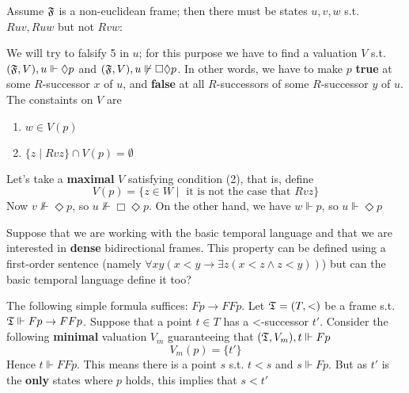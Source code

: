 \documentclass[11pt]{article}
\begin{document}
\begin{examplle}[]
Assume \(\mathfrak{F}\) is a non-euclidean frame; then there must be states \(u,v,w\)
s.t. \(Ruv,Ruw\) but not \(Rvw\):
We will try to falsify 5 in \(u\); for this purpose we have to find a
valuation \(V\) s.t. \((\mathfrak{F},V),u\Vdash\Diamond p\) and
\((\mathfrak{F},V),u\not\Vdash\Box\Diamond p\). In other words, we have to make \(p\)
\textbf{true} at some \(R\)-successor \(x\) of \(u\), and \textbf{false} at all
\(R\)-successors of some \(R\)-successor \(y\) of \(u\). The constaints on
\(V\) are
\begin{enumerate}
\item \(w\in V(p)\)
\item \(\{z\mid Rvz\}\cap V(p)=\emptyset\)
\end{enumerate}


Let's take a \textbf{maximal} \(V\) satisfying condition (2), that is, define
\begin{equation*}
V(p)=\{z\in W\mid\text{ it is not the case that }Rvz\}
\end{equation*}
Now \(v\not\Vdash\Diamond p\), so \(u\not\Vdash\Box\Diamond p\). On the other
hand, we have \(w\Vdash p\), so \(u\Vdash\Diamond p\)
\end{examplle}

\begin{examplle}[]
Suppose that we are working with the basic temporal language and that we are
interested in \textbf{dense} bidirectional frames. This property can be defined using
a first-order sentence (namely \(\forall xy(x<y\to\exists z(x<z\wedge
   z<y))\)) but can the basic temporal language define it too?

The following simple formula suffices: \(Fp\to FFp\). Let \(\mathfrak{T}=(T,<)\) be a
frame s.t. \(\mathfrak{T}\Vdash Fp\to FFp\). Suppose that a point \(t\in T\) has a
<-successor \(t'\). Consider the following \textbf{minimal} valuation \(V_m\)
guaranteeing that \((\mathfrak{T},V_m),t\Vdash Fp\)
\begin{equation*}
V_m(p)=\{t'\}
\end{equation*}
Hence \(t\Vdash FFp\). This means there is a point \(s\) s.t. \(t<s\) and
\(s\Vdash Fp\). But as \(t'\) is the \textbf{only} states where \(p\) holds, this
implies that \(s<t'\)
\end{examplle}
\end{document}
